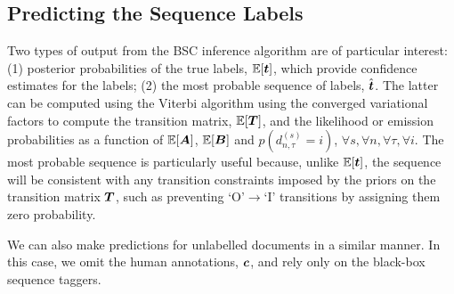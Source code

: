 \subsection{Predicting the Sequence Labels}

Two types of output from the BSC inference algorithm are of particular interest: (1) posterior probabilities of 
the true labels, $\mathbb{E}[\boldsymbol t]$, which provide confidence estimates for the labels; (2) the most 
probable sequence of labels, $\hat{\boldsymbol t}$. The latter can be computed using the Viterbi algorithm 
using the converged variational factors to compute the transition matrix, $\mathbb{E}[\boldsymbol T]$,
and the likelihood or emission probabilities as a function of $\mathbb{E}[\boldsymbol A]$, $\mathbb{E}[\boldsymbol B]$ and
$\hat{p}(d_{n,\tau}^{(s)}=i)$, $\forall s, \forall n, \forall \tau, \forall i$.
The most probable sequence is particularly useful because, unlike $\mathbb{E}[\boldsymbol t]$,
the sequence will be consistent with any transition 
constraints imposed by the priors on the transition matrix $\boldsymbol T$, 
such as preventing `O'$\rightarrow$`I' transitions by assigning them zero probability.

We can also make predictions for unlabelled documents in a similar manner. In this case, we omit the 
human annotations, $\boldsymbol c$, and rely only on the black-box sequence taggers.

